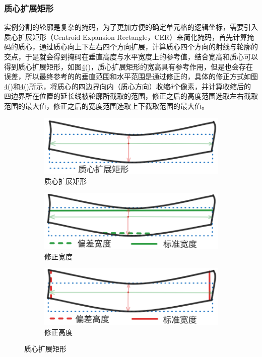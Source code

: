 \documentclass[UTF8,12pt, AutoFakeBold,fontset = founder]{ctexart}
\begin{document}
\subsubsection{质心扩展矩形}

实例分割的轮廓是复杂的掩码，为了更加方便的确定单元格的逻辑坐标，需要引入质心扩展矩形（Centroid-Expansion Rectangle，CER）来简化掩码，首先计算掩码的质心，通过质心向上下左右四个方向扩展，计算质心四个方向的射线与轮廓的交点，于是就会得到掩码在垂直高度与水平宽度上的参考值，结合宽高和质心可以得到质心扩展矩形，如图\ref{fig:r}()，质心扩展矩形的宽高具有参考作用，但是也会存在误差，所以最终参考的的垂直范围和水平范围是通过修正的，具体的修正方式如图\ref{fig:r}()和\ref{fig:r}()所示，将质心的四边界向内（质心方向）收缩$\delta $个像素，并计算收缩后的四边界所在位置的延长线被轮廓所截取的范围，修正之后的高度范围选取左右截取范围的最大值，修正之后的宽度范围选取上下截取范围的最大值。

\begin{figure}[H]
    \centering
    \begin{subfigure}[b]{0.3\textwidth}
        \includegraphics[width=\textwidth]{../images/CER.png}
        \caption{质心扩展矩形}
        \label{fig:CER}
    \end{subfigure}
    \hfill
    \begin{subfigure}[b]{0.3\textwidth}
        \includegraphics[width=\textwidth]{../images/x.png}
        \caption{修正宽度}
        \label{fig:w-re}
    \end{subfigure}
    \hfill
    \begin{subfigure}[b]{0.3\textwidth}
        \includegraphics[width=\textwidth]{../images/y.png}
        \caption{修正高度}
        \label{fig:h-re}
    \end{subfigure}
    \caption{质心扩展矩形}
    \label{fig:r}
\end{figure}
\end{document}
